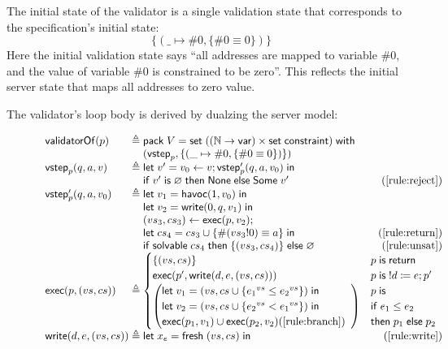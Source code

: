 The initial state of the validator is a single validation state that corresponds
to the specification's initial state:
\[\{(\_\mapsto\#0,\{\#0\equiv0\})\}\]
Here the initial validation state says ``all addresses are mapped to variable
$\#0$, and the value of variable $\#0$ is constrained to be zero''.  This
reflects the initial server state that maps all addresses to zero value.

The validator's loop body is derived by dualzing the server model:

\begin{figure}[h]
\[\begin{array}{l@{\;}r@{\;}l}
\validatorOf(p)&\triangleq&\existT{V}{\Set((\Nat\to\Var)\times\Set\constraint)}{\\
  &&(\vstep_p,\{(\_\mapsto\#0,\{\#0\equiv0\})\})}\\
\vstep_p(q,a,v)&\triangleq&\letin{v'}{v_0\gets v;\vstep'_p(q,a,v_0)}\\
&&\If v'\Is\varnothing\Then\None\Else\Some v'\hfill(\ref{rule:reject})\\
\vstep'_p(q,a,v_0)&\triangleq&\letin{v_1}{\Havoc(1,v_0)}\\
&&\letin{v_2}{\Write(0,q,v_1)}\\
&&(vs_3,cs_3)\gets\Exec(p,v_2);\\
&&\letin{cs_4}{cs_3\cup\{\#(vs_3!0)\equiv a\}}\hfill(\ref{rule:return})\\
&&\If\solvable cs_4\Then\{(vs_3,cs_4)\}\Else\varnothing\hfill(\ref{rule:unsat})\\
\Exec(p,(vs,cs))&\triangleq&\begin{cases}
  \{(vs,cs)\}&p\Is\Return\\
  \Exec(p',\Write(d,e,(vs,cs)))&p\Is !d\coloneqq e;p'\\
  \left(\begin{array}{@{}l}
    \letin{v_1}{(vs,cs\cup\{{e_1}^{vs}\le{e_2}^{vs}\})}\\
    \letin{v_2}{(vs,cs\cup\{{e_2}^{vs}<{e_1}^{vs}\})}\\
    \Exec(p_1,v_1)\cup\Exec(p_2,v_2)\hfill(\ref{rule:branch})
  \end{array}\right)&\begin{array}{@{}l}p\Is\\
    \If e_1\le e_2\\
    \tthen p_1\Else p_2\end{array}
\end{cases}\\
\Write(d,e,(vs,cs))&\triangleq&\letin{x_e}{\Fresh (vs,cs)}\hfill(\ref{rule:write})\\

\end{array}\]
\end{figure}
